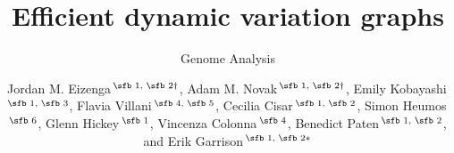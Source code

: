 \documentclass{bioinfo}
\begin{document}

\subtitle{Genome Analysis}

\title[short Title]{Efficient dynamic variation graphs}
\author[Eizenga, \textit{et~al}.]{
Jordan M. Eizenga\,$^{\text{\sfb 1, \sfb 2} \dagger}$, 
Adam M. Novak\,$^{\text{\sfb 1, \sfb 2} \dagger}$, 
Emily Kobayashi\,$^{\text{\sfb 1, \sfb 3}}$,
Flavia Villani\,$^{\text{\sfb 4, \sfb 5}}$,
Cecilia Cisar\,$^{\text{\sfb 1, \sfb 2}}$,
Simon Heumos\,$^{\text{\sfb 6}}$,
Glenn Hickey\,$^{\text{\sfb 1}}$,
Vincenza Colonna\,$^{\text{\sfb 4}}$,
Benedict Paten\,$^{\text{\sfb 1, \sfb 2}}$,
and Erik Garrison\,$^{\text{\sfb 1, \sfb 2}*}$
}

\address{
$^{\text{\sf 1}}$Genomics Institute, University of California Santa Cruz, Santa Cruz, CA, USA, 95064, and \\
$^{\text{\sf 2}}$Biomolecular Engineering and Bioinformatics, University of California Santa Cruz, Santa Cruz, CA, USA, 95064, \\
$^{\text{\sf 3}}$Bioinformatics and Systems Biology, University of California San Diego, La Jolla, CA, USA, 92093, \\
$^{\text{\sf 4}}$Institute of Genetics and Biophysics, Consiglio Nazionale di Ricerche, Naples, Italy, 80131, \\
$^{\text{\sf 5}}$Biotecnologie Mediche, Universit\`a degli Studi di Napoli Federico II, Naples, Italy, 80138, and \\
$^{\text{\sf 6}}$Quantitative Biology Center (QBiC), University of T\"ubingen, T\"ubingen, Germany, 72076
}



\end{document}
